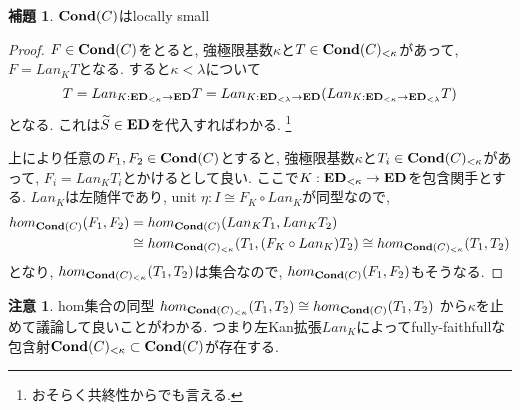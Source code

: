 \documentclass[dvipdfmx,a4paper,11pt]{report}
\theoremstyle{definition}
\newtheorem{lem}[thm]{補題}
\newtheorem{rem}[thm]{注意}
\begin{document}
\begin{tcolorbox}
 [colback = white, colframe = green!35!black, fonttitle = \bfseries,breakable = true]
\begin{lem}
${\bf Cond}(C)$はlocally small
\end{lem}
 \end{tcolorbox}
\begin{proof}
$F \in {\bf Cond}(C)$をとると, 強極限基数$\kappa$と$T \in {\bf Cond}(C)_{< \kappa}$があって, $F = Lan_{K}T$となる. 
すると$\kappa < \lambda$について
$$T = Lan_{K: {\bf ED}_{< \kappa} \to {\bf ED}}T 
= Lan_{K: {\bf ED}_{< \lambda } \to {\bf ED}} (Lan_{K: {\bf ED}_{< \kappa} \to {\bf ED}_{< \lambda}}T)$$
となる. これは$\widetilde{S} \in {\bf ED}$を代入すればわかる. \footnote{おそらく共終性からでも言える. }

上により任意の$F_1, F_2 \in {\bf Cond}(C)$とすると, 強極限基数$\kappa$と$T_i \in {\bf Cond}(C)_{< \kappa}$があって, $F_i = Lan_{K}T_i$とかけるとして良い. 
ここで$K : {\bf ED}_{< \kappa} \to {\bf ED}$を包含関手とする.
$ Lan_{K}$は左随伴であり, unit $\eta: I \cong F_{K} \circ Lan_{K} $が同型なので, 
\begin{align*}
\begin{split}
hom_{{\bf Cond}(C)}(F_1, F_2)
&=
hom_{{\bf Cond}(C)}( Lan_{K}T_1,  Lan_{K}T_2)\\
&\cong
hom_{{\bf Cond}(C)_{<\kappa}}(T_1,  (F_{K} \circ Lan_{K})T_2)
\cong 
hom_{{\bf Cond}(C)_{<\kappa}}(T_1, T_2)
\end{split}
\end{align*}
となり, $hom_{{\bf Cond}(C)_{<\kappa}}(T_1, T_2)$は集合なので, $hom_{{\bf Cond}(C)}(F_1, F_2)$もそうなる. 
\end{proof}

\begin{rem}
hom集合の同型
$hom_{{\bf Cond}(C)_{<\kappa}}(T_1,  T_2)
\cong 
hom_{{\bf Cond}(C)}(T_1, T_2)$
から$\kappa$を止めて議論して良いことがわかる.
つまり左Kan拡張$Lan_{K}$によってfully-faithfullな包含射${\bf Cond}(C)_{< \kappa} \subset {\bf Cond}(C)$が存在する. 
\end{rem}
\end{document}
